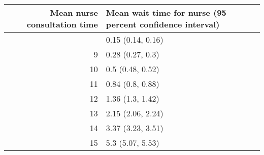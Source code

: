 \begin{table}[!t]


\fontsize{12.0pt}{14.4pt}\selectfont

\begin{tabular*}{\linewidth}{@{\extracolsep{\fill}}rl}
\toprule
Mean nurse consultation time & Mean wait time for nurse (95 percent confidence interval) \\ 
\midrule\addlinespace[2.5pt]
8 & 0.15 (0.14, 0.16) \\
9 & 0.28 (0.27, 0.3) \\
10 & 0.5 (0.48, 0.52) \\
11 & 0.84 (0.8, 0.88) \\
12 & 1.36 (1.3, 1.42) \\
13 & 2.15 (2.06, 2.24) \\
14 & 3.37 (3.23, 3.51) \\
15 & 5.3 (5.07, 5.53) \\
\bottomrule
\end{tabular*}

\end{table}
